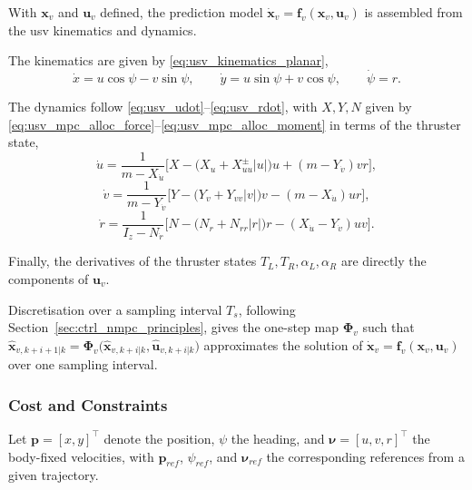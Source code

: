 With $\mathbf{x}_v$ and $\mathbf{u}_v$ defined, the prediction model $\dot{\mathbf{x}}_v = \mathbf{f}_v(\mathbf{x}_v,\mathbf{u}_v)$ is assembled from the \gls{usv} kinematics and dynamics.

The kinematics are given by \eqref{eq:usv_kinematics_planar},
\begin{equation}
    \dot x = u\cos\psi - v\sin\psi, \qquad \dot y = u\sin\psi + v\cos\psi, \qquad \dot\psi = r.
    \label{eq:usv_mpc_kinematics}
\end{equation}

The dynamics follow \eqref{eq:usv_udot}--\eqref{eq:usv_rdot}, with $X,Y,N$ given by \eqref{eq:usv_mpc_alloc_force}--\eqref{eq:usv_mpc_alloc_moment} in terms of the thruster state,
\begin{equation}
    \dot u = \frac{1}{m - X_{\dot u}}\Big[X - \big(X_u + X_{uu}^{\pm}|u|\big)u + (m - Y_{\dot v})vr\Big],
    \label{eq:usv_mpc_udot}
\end{equation}
\begin{equation}
    \dot v = \frac{1}{m - Y_{\dot v}}\Big[Y - \big(Y_v + Y_{vv}|v|\big)v - (m - X_{\dot u})ur\Big],
    \label{eq:usv_mpc_vdot}
\end{equation}
\begin{equation}
    \dot r = \frac{1}{I_z - N_{\dot r}}\Big[N - \big(N_r + N_{rr}|r|\big)r - (X_{\dot u} - Y_{\dot v})uv\Big].
    \label{eq:usv_mpc_rdot}
\end{equation}

Finally, the derivatives of the thruster states $T_L, T_R, \alpha_L, \alpha_R$ are directly the components of $\mathbf{u}_v$.

Discretisation over a sampling interval $T_s$, following Section~\ref{sec:ctrl_nmpc_principles}, gives the one-step map $\boldsymbol\Phi_v$ such that $\hat{\mathbf{x}}_{v,k+i+1|k} = \boldsymbol\Phi_v\big(\hat{\mathbf{x}}_{v,k+i|k}, \hat{\mathbf{u}}_{v,k+i|k}\big)$ approximates the solution of $\dot{\mathbf{x}}_v = \mathbf{f}_v(\mathbf{x}_v,\mathbf{u}_v)$ over one sampling interval.


\subsubsection*{Cost and Constraints}
 
Let $\mathbf{p} = [x,y]^\top$ denote the position, $\psi$ the heading, and $\boldsymbol{\nu} = [u,v,r]^\top$ the body-fixed velocities, with $\mathbf{p}_{ref}$, $\psi_{ref}$, and $\boldsymbol{\nu}_{ref}$ the corresponding references from a given trajectory.

